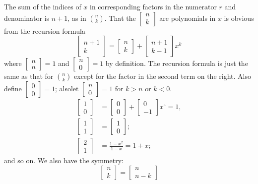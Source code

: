 The sum of the indices of $x$ in corresponding factors in the
numerator $r$ and denominator is $n+1$, as in $\binom{n}{k}$. That
the $\begin{bmatrix}n\\k\end{bmatrix}$ are polynomials in $x$ is
  obvious from the recursion formula
$$
\begin{bmatrix}n+1\\k\end{bmatrix}
  = \begin{bmatrix}n\\k\end{bmatrix}+ \begin{bmatrix}n+1\\k-1\end{bmatrix}
      x^k  
$$  
where $\begin{bmatrix}n\\n\end{bmatrix}=1$ and
  $\begin{bmatrix}n\\0\end{bmatrix}=1$ by definition. The recursion
    formula is just the same as that for $\binom{n}{k}$ except for the
    factor in the second term on the right. Also define
    $\begin{bmatrix}0\\0\end{bmatrix}=1$; also\pageoriginale let
      $\begin{bmatrix}n\\0\end{bmatrix}=1$ for $k>n$ or $k<0$.
\begin{align*}
  \begin{bmatrix}1\\0\end{bmatrix} &
    = \begin{bmatrix}0\\0\end{bmatrix}+ \begin{bmatrix}0\\-1\end{bmatrix}
        x^\circ =1,\\
  \begin{bmatrix}1\\1\end{bmatrix} &
    = \begin{bmatrix}1\\0\end{bmatrix};\\
  \begin{bmatrix}2\\1\end{bmatrix} & = \frac{1-x^2}{1-x} = 1+x;   
\end{align*}
and so on. We also have the symmetry:
$$
\begin{bmatrix}n\\k\end{bmatrix}= \begin{bmatrix}n\\n-k\end{bmatrix}
$$

